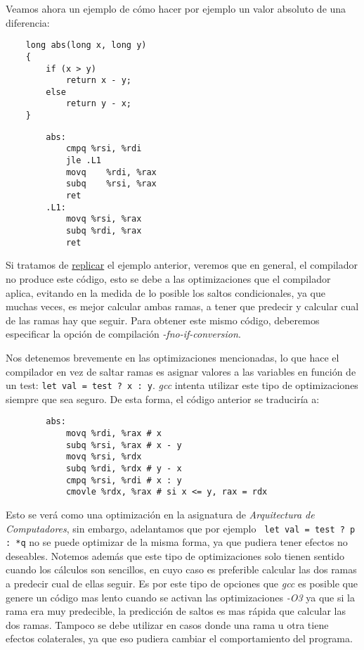 \begin{ejemplo}
	Veamos ahora un ejemplo de cómo hacer por ejemplo un valor absoluto de una diferencia:
	\begin{center}
		\begin{minipage}{0.39\textwidth}
			\begin{verbatim}
    long abs(long x, long y)
    {
        if (x > y)
            return x - y;
        else
            return y - x;
    }
            \end{verbatim}
		\end{minipage}
		\begin{minipage}{0.6\textwidth}
			\begin{verbatim}
        abs:
            cmpq %rsi, %rdi
            jle .L1
            movq    %rdi, %rax
            subq    %rsi, %rax
            ret
        .L1:
            movq %rsi, %rax
            subq %rdi, %rax
            ret
			\end{verbatim}
		\end{minipage}
	\end{center}
	Si tratamos de \href{https://godbolt.org/z/aj7f7os8d}{replicar} el ejemplo anterior, veremos que en general, el compilador no produce este código,
	esto se debe a las optimizaciones que el compilador aplica, evitando en la medida de lo posible los saltos condicionales, ya que muchas veces,
	es mejor calcular ambas ramas, a tener que predecir y calcular cual de las ramas hay que seguir.
	Para obtener este mismo código, deberemos especificar la opción de compilación \textit{-fno-if-conversion}.
\end{ejemplo}
Nos detenemos brevemente en las optimizaciones mencionadas, lo que hace el compilador en vez de saltar ramas es asignar valores a las variables
en función de un test: \texttt{let val = test ? x : y}. \textit{gcc} intenta utilizar este tipo de optimizaciones siempre que sea seguro.
De esta forma, el código anterior se traduciría a:
\begin{center}
	\begin{verbatim}
        abs:
            movq %rdi, %rax # x
            subq %rsi, %rax # x - y
            movq %rsi, %rdx 
            subq %rdi, %rdx # y - x
            cmpq %rsi, %rdi # x : y
            cmovle %rdx, %rax # si x <= y, rax = rdx
    \end{verbatim}
\end{center}
Esto se verá como una optimización en la asignatura de \textit{Arquitectura de Computadores}, sin embargo, adelantamos
que por ejemplo \texttt{ let val = test ? p : *q} no se puede optimizar de la misma forma, ya que pudiera tener efectos no deseables.
Notemos además que este tipo de optimizaciones solo tienen sentido cuando los cálculos son sencillos, en cuyo caso es preferible calcular las
dos ramas a predecir cual de ellas seguir. Es por este tipo de opciones que \textit{gcc} es posible que genere un código mas lento cuando se activan
las optimizaciones \textit{-O3} ya que si la rama era muy predecible, la predicción de saltos es mas rápida que calcular las dos ramas.
Tampoco se debe utilizar en casos donde una rama u otra tiene efectos colaterales, ya que eso pudiera cambiar el comportamiento del programa.
